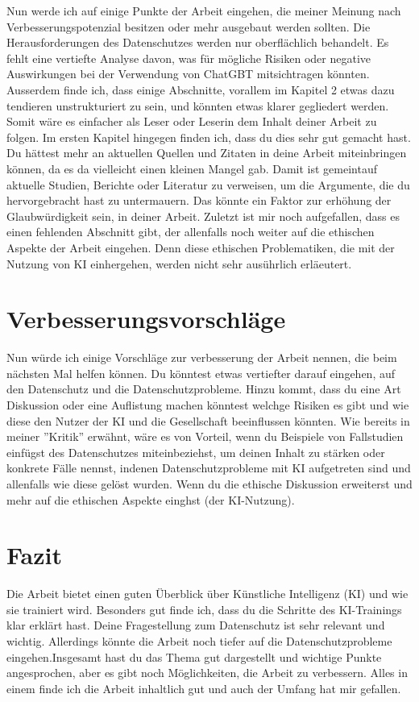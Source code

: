 \documentclass{article}
\begin{document}
Nun werde ich auf einige Punkte der Arbeit eingehen, die meiner Meinung nach Verbesserungspotenzial besitzen oder mehr ausgebaut werden sollten. Die Herausforderungen des Datenschutzes werden nur oberflächlich behandelt. Es fehlt eine vertiefte Analyse davon, was für mögliche Risiken oder negative Auswirkungen bei der Verwendung von ChatGBT mitsichtragen könnten. Ausserdem finde ich, dass einige Abschnitte, vorallem im Kapitel 2 etwas dazu tendieren unstrukturiert zu sein, und könnten etwas klarer gegliedert werden. Somit wäre es einfacher als Leser oder Leserin dem Inhalt deiner Arbeit zu folgen. Im ersten Kapitel hingegen finden ich, dass du dies sehr gut gemacht hast. Du hättest mehr an aktuellen Quellen und Zitaten in deine Arbeit miteinbringen können, da es da vielleicht einen kleinen Mangel gab. Damit ist gemeintauf aktuelle Studien, Berichte oder Literatur zu verweisen, um die Argumente, die du hervorgebracht hast zu untermauern. Das könnte ein Faktor  zur erhöhung der Glaubwürdigkeit sein, in deiner Arbeit. Zuletzt ist mir noch aufgefallen, dass es einen fehlenden Abschnitt gibt, der allenfalls noch weiter auf die ethischen Aspekte der Arbeit eingehen. Denn diese ethischen Problematiken, die mit der Nutzung von KI einhergehen, werden nicht sehr ausührlich erläeutert. 

\section{Verbesserungsvorschläge}

Nun würde ich einige Vorschläge zur verbesserung der Arbeit nennen, die beim nächsten Mal helfen können. Du könntest etwas vertiefter darauf eingehen, auf den Datenschutz und die Datenschutzprobleme. Hinzu kommt, dass du eine Art Diskussion oder eine Auflistung machen könntest welchge Risiken es gibt und wie diese den Nutzer der KI und die Gesellschaft beeinflussen könnten. Wie bereits in meiner ''Kritik'' erwähnt, wäre es von Vorteil, wenn du Beispiele von Fallstudien einfügst des Datenschutzes miteinbeziehst, um deinen Inhalt zu stärken oder konkrete Fälle  nennst, indenen Datenschutzprobleme mit KI aufgetreten sind und allenfalls wie diese gelöst wurden. Wenn du die ethische Diskussion erweiterst und mehr auf die ethischen Aspekte einghst (der KI-Nutzung).

\section{Fazit}
Die Arbeit bietet einen guten Überblick über Künstliche Intelligenz (KI) und wie sie trainiert wird. Besonders gut finde ich, dass du die Schritte des KI-Trainings klar erklärt hast. Deine Fragestellung zum Datenschutz ist sehr relevant und wichtig. Allerdings könnte die Arbeit noch tiefer auf die Datenschutzprobleme eingehen.Insgesamt hast du das Thema gut dargestellt und wichtige Punkte angesprochen, aber es gibt noch Möglichkeiten, die Arbeit zu verbessern. Alles in einem finde ich die Arbeit inhaltlich gut und auch der Umfang hat mir gefallen.




\printbibliography
\end{document}
